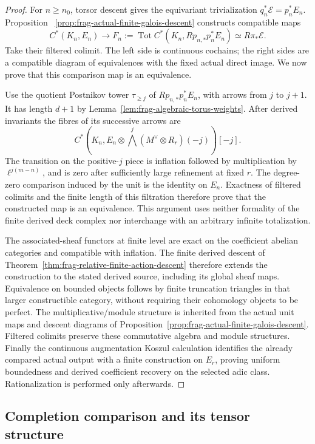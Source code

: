 \documentclass[11pt]{article}
\theoremstyle{definition}
\theoremstyle{remark}
\begin{document}
\begin{proof}
For $n\ge n_0$, torsor descent gives the equivariant trivialization
$q_n^*\mathcal E=p_n^*E_n$.  Proposition~
\ref{prop:frag-actual-finite-galois-descent} constructs compatible maps
\[
C^*(K_n,E_n)\longrightarrow
F_n:=\operatorname{Tot}C^*(K_n,Rp_{n,*}p_n^*E_n)
 \simeq R\pi_*\mathcal E.
\]
Take their filtered colimit.  The left side is continuous cochains;
the right sides are a compatible diagram of equivalences with the
fixed actual direct image.  We now prove that this comparison map
is an equivalence.

Use the quotient Postnikov tower $\tau_{\ge j}$ of
$Rp_{n,*}p_n^*E_n$, with arrows from $j$ to $j+1$.  It has length
$d+1$ by Lemma~\ref{lem:frag-algebraic-torus-weights}.  After derived
invariants the fibres of its successive arrows are
\[
 C^*(K_n,E_n\otimes\bigwedge^j(M^\vee\otimes R_r)(-j))[-j].
\]
The transition on the positive-$j$ piece is inflation followed by
multiplication by $\ell^{j(m-n)}$, and is zero after sufficiently
large refinement at fixed $r$.  The degree-zero comparison induced
by the unit is the identity on $E_n$.  Exactness of filtered colimits
and the finite length of this filtration therefore prove that the
constructed map is an equivalence.  This argument uses neither
formality of the finite derived deck complex nor interchange with
an arbitrary infinite totalization.

The associated-sheaf functors at finite level are exact on the
coefficient abelian categories and compatible with inflation.  The
finite derived descent of Theorem~\ref{thm:frag-relative-finite-action-descent}
therefore extends the construction to the stated derived source,
including its global sheaf maps.  Equivalence on bounded objects
follows by finite truncation triangles in that larger constructible
category, without requiring their cohomology objects to be perfect.
The multiplicative/module structure is inherited from the actual
unit maps and descent diagrams of Proposition~\ref{prop:frag-actual-finite-galois-descent}.  Filtered colimits preserve
these commutative algebra and module structures.  Finally the
continuous augmentation Koszul calculation identifies the already
compared actual output with a finite construction on $E_r$, proving
uniform boundedness and derived coefficient recovery on the selected
adic class.  Rationalization is performed only afterwards.
\end{proof}


\subsection{Completion comparison and its tensor structure}
\end{document}
